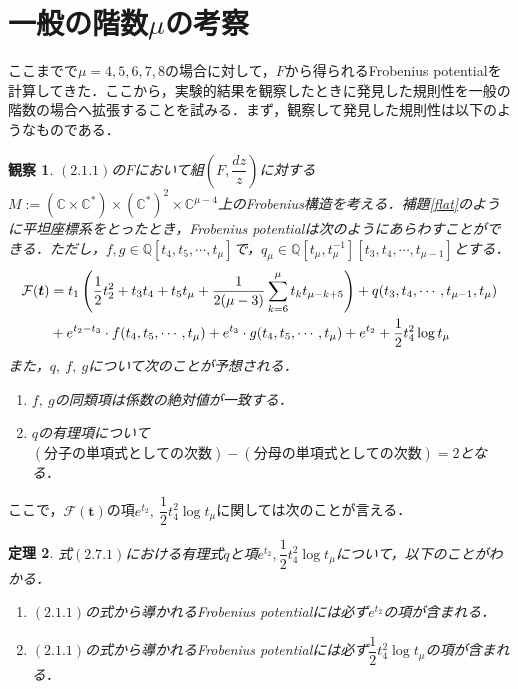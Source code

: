 \documentclass[a4paper,11pt]{jbook}
\theoremstyle{plain}
\newtheorem{thm}{定理}[section]
\newtheorem{observ}[thm]{観察}
\theoremstyle{definition}
\theoremstyle{remark}
\theoremstyle{proof}
\numberwithin{equation}{section}
\def\CC{{\mathbb C}}
\def\QQ{{\mathbb Q}}
\def\F{{\mathcal F}}
\begin{document}
\section{一般の階数$\mu$の考察}%
	ここまでで$\mu=4,5,6,7,8$の場合に対して，$F$から得られるFrobenius potentialを計算してきた．ここから，実験的結果を観察したときに発見した規則性を一般の階数の場合へ拡張することを試みる．まず，観察して発見した規則性は以下のようなものである．
\begin{observ}\rm 
$(2.1.1)$の$F$において組$(F,\dfrac{dz}{z})$に対する$M:=(\CC\times\CC^*)\times(\CC^*)^{2}\times\CC^{\mu-4}$上のFrobenius構造を考える．補題\ref{flat}のように平坦座標系をとったとき，Frobenius potentialは次のようにあらわすことができる．ただし，$f,g \in \QQ[t_4, t_5, \cdots, t_{\mu}]$で，$q_\mu \in \QQ[t_\mu, t_\mu^{-1}][t_3, t_4, \cdots, t_{\mu-1}]$とする．
\begin{align}
\F(\bm{t})&=t_1\left(\frac{1}{2}t_2^2+t_3t_4+t_5t_\mu+\frac{1}{2(\mu-3)}\sum_{k=6}^{\mu}t_kt_{\mu-k+5}\right) 
+q(t_3,t_4,\cdots,t_{\mu-1}, t_\mu) \notag \\
&+e^{t_2-t_3}\cdot f(t_4,t_5,\cdots,t_\mu)  
+e^{t_3}\cdot g(t_4,t_5,\cdots,t_\mu)
+e^{t_2}+\frac{1}{2}t_4^2\log{t_\mu}
\end{align}
また，$q,\ f,\ g$について次のことが予想される．
\begin{enumerate}
\item[o1.]\label{o1} $f,\ g$の同類項は係数の絶対値が一致する．

\item[o2.]\label{o2} $q$の有理項について$(分子の単項式としての次数)-(分母の単項式としての次数)=2$となる．
\end{enumerate}
\end{observ}

	ここで，$\F(\bm{t})$の項$e^{t_2}, \ \dfrac{1}{2}t_4^2\log{t_\mu}$に関しては次のことが言える．

\begin{thm}\rm
	式$(2.7.1)$における有理式$q$と項$e^{t_2},\dfrac{1}{2}t_4^2\log{t_\mu}$について，以下のことがわかる．
\begin{enumerate}
	\item $(2.1.1)$の式から導かれるFrobenius potentialには必ず$e^{t_2}$の項が含まれる．

	\item $(2.1.1)$の式から導かれるFrobenius potentialには必ず$\dfrac{1}{2}t_4^2\log{t_\mu}$の項が含まれる．
\end{enumerate}
\end{thm}
\end{document}
